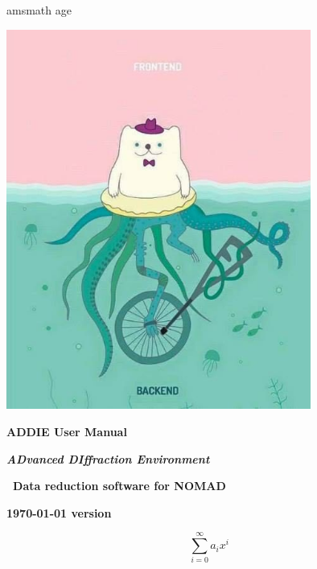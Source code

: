 \documentclass{report}
\begin{document}
{\let\cleardoublep\usepackage{amsmath}
age\clearpage 
\begin{titlepage}
	\centering
	\includegraphics[width=0.75\textwidth]{graphics/joke_image.jpg}\par\vspace{1cm}
	\vspace{2cm}
	{\huge\bfseries ADDIE User Manual\par}
	{\LARGE\bfseries\itshape ADvanced DIffraction Environment\par}
	\vspace{1cm}
	{\Large\bfseries\ Data reduction software for NOMAD\par}
	\vfill
	{\large\bfseries \today{} version \par}
\end{titlepage}
 

 \tableofcontents

}

\begin{equation}
\label{eq:1}
\sum_{i=0}^{\infty} a_i x^i
\end{equation}

 


\end{document}
